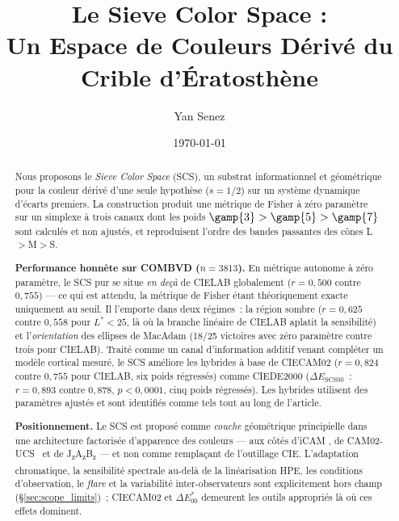 \documentclass[12pt,a4paper]{article}
\title{Le Sieve Color Space :\\
Un Espace de Couleurs D\'eriv\'e du Crible d'\'Eratosth\`ene}
\author{Yan Senez}
\date{\today}
\begin{document}
\maketitle

\begin{abstract}
Nous proposons le \emph{Sieve Color Space} (SCS), un substrat
informationnel et g\'eom\'etrique pour la couleur d\'eriv\'e d'une
seule hypoth\`ese ($s = 1/2$) sur un syst\`eme dynamique d'\'ecarts
premiers. La construction produit une m\'etrique de Fisher \`a z\'ero
param\`etre sur un simplexe \`a trois canaux dont les poids
$\gamp{3} > \gamp{5} > \gamp{7}$ sont calcul\'es et non ajust\'es, et
reproduisent l'ordre des bandes passantes des c\^ones L$>$M$>$S.

\medskip\noindent\textbf{Performance honn\^ete sur COMBVD
($n = 3813$).} En m\'etrique autonome \`a z\'ero param\`etre, le SCS
pur se situe \emph{en de\c{c}\`a} de CIELAB globalement
($r = 0{,}500$ contre $0{,}755$) --- ce qui est attendu, la m\'etrique
de Fisher \'etant th\'eoriquement exacte uniquement au seuil. Il
l'emporte dans deux r\'egimes~: la r\'egion sombre ($r = 0{,}625$
contre $0{,}558$ pour $L^* < 25$, l\`a o\`u la branche lin\'eaire de
CIELAB aplatit la sensibilit\'e) et l'\emph{orientation} des ellipses
de MacAdam (18/25 victoires avec z\'ero param\`etre contre trois pour
CIELAB). Trait\'e comme un canal d'information additif venant
compl\'eter un mod\`ele cortical mesur\'e, le SCS am\'eliore les
hybrides \`a base de CIECAM02 ($r = 0{,}824$ contre $0{,}755$ pour
CIELAB, six poids r\'egress\'es) comme CIEDE2000
($\Delta E_{\mathrm{SCS00}}$~: $r = 0{,}893$ contre $0{,}878$,
$p < 0{,}0001$, cinq poids r\'egress\'es). Les hybrides utilisent des
param\`etres ajust\'es et sont identifi\'es comme tels tout au long de
l'article.

\medskip\noindent\textbf{Positionnement.} Le SCS est propos\'e comme
\emph{couche} g\'eom\'etrique principielle dans une architecture
factoris\'ee d'apparence des couleurs --- aux c\^ot\'es d'iCAM
\cite{fairchildjohnson2004}, de CAM02-UCS~\cite{luo2006} et de
J\textsubscript{z}A\textsubscript{z}B\textsubscript{z}
\cite{safdar2017} --- et non comme rempla\c{c}ant de l'outillage
CIE. L'adaptation chromatique, la sensibilit\'e spectrale au-del\`a
de la lin\'earisation HPE, les conditions d'observation, le
\emph{flare} et la variabilit\'e inter-observateurs sont
explicitement hors champ (\S\ref{sec:scope_limits})~; CIECAM02 et
$\Delta E^*_{00}$ demeurent les outils appropri\'es l\`a o\`u ces
effets dominent.


\end{abstract}
\end{document}
